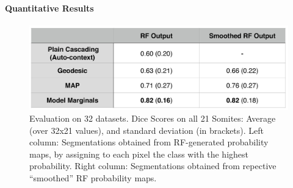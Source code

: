 \documentclass[10pt,twocolumn,letterpaper]{article}
\begin{document}
\paragraph{Quantitative Results}
%
\begin{figure}[t]
\begin{center}
\includegraphics[width=\columnwidth]{TableDiceScores_2columns_noGeoF2.jpg} %
\caption{Evaluation on 32 datasets. Dice Scores on all 21 Somites: Average (over 32x21 values), and standard deviation (in brackets). Left column: Segmentations obtained from RF-generated probability maps, by assigning to each pixel the class with the highest probability. Right column: Segmentations obtained from repective ``smoothed'' RF probability maps.}
\label{tab:results}
\end{center}
\end{figure}
%
\end{document}
